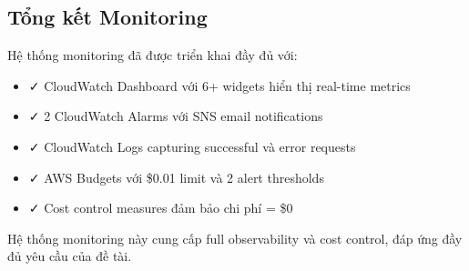 \subsection{Tổng kết Monitoring}
\label{ssec:monitoring_summary}

Hệ thống monitoring đã được triển khai đầy đủ với:

\begin{itemize}
    \item ✓ CloudWatch Dashboard với 6+ widgets hiển thị real-time metrics
    \item ✓ 2 CloudWatch Alarms với SNS email notifications
    \item ✓ CloudWatch Logs capturing successful và error requests
    \item ✓ AWS Budgets với \$0.01 limit và 2 alert thresholds
    \item ✓ Cost control measures đảm bảo chi phí = \$0
\end{itemize}

Hệ thống monitoring này cung cấp full observability và cost control, đáp ứng đầy đủ yêu cầu của đề tài.
